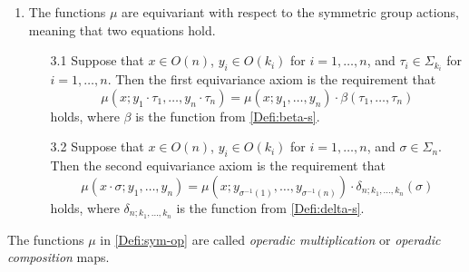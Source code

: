 \begin{Defi}
\begin{enumerate}
\item The functions $\mu$ are equivariant with respect to the symmetric group actions, meaning that two equations hold.
\begin{itemize}
\item[3.1] Suppose that $x \in O(n)$, $y_i \in O(k_i)$ for $i = 1, \ldots, n$, and $\tau_i \in \Sigma_{k_i}$ for  $i = 1, \ldots, n$. Then the first equivariance axiom is the requirement that
\[
\mu(x;y_1 \cdot \tau_1,\ldots,y_n \cdot \tau_n) = \mu(x;y_1,\ldots,y_n)\cdot \beta(\tau_1,\ldots,\tau_n)
\]
holds, where $\beta$ is the function from \cref{Defi:beta-s}.
\end{itemize}
\begin{itemize}
\item[3.2] Suppose that  $x \in O(n)$, $y_i \in O(k_i)$ for $i = 1, \ldots, n$, and $\sigma \in \Sigma_{n}$. 
Then the second equivariance axiom is the requirement that
\[
 \mu(x \cdot \sigma; y_1, \ldots, y_n) = \mu\left(x;y_{\sigma^{-1}(1)},\ldots,y_{\sigma^{-1}(n)}\right)\cdot \delta_{n; k_1, \ldots, k_n}(\sigma)
\]
holds, where $\delta_{n; k_1, \ldots, k_n}$ is the function from \cref{Defi:delta-s}.
\end{itemize}
%
\end{enumerate}
\end{Defi}

\begin{Defi}\label{Defi:operadic-mult}
The functions $\mu$ in \cref{Defi:sym-op} are called \emph{operadic multiplication} or \emph{operadic composition} maps.
\end{Defi}

